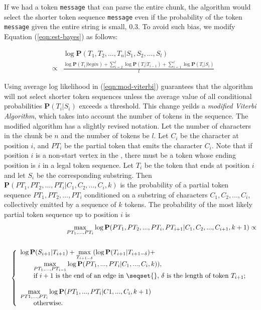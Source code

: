 If we had a token {\tt message} that can parse the entire chunk,
the algorithm would select the shorter token sequence {\tt message}
even if the probability of the token {\tt message} given the entire
string is small, \eg{} 0.3.  To avoid such bias, we modify
Equation (\ref{eqn:est-bayes}) as follows:

\begin{eqnarray}
&& \log \mathbf{P}(T_1, T_2, ..., T_n|S_1, S_2, ..., S_l) \nonumber \\ 
& \propto & \frac{\log \mathbf{P}(T_1|begin) +
\sum_{i=2}^{l}\log \mathbf{P}(T_i|T_{i-1}) + 
\sum_{i=1}^{l}\log \mathbf{P}(T_i|S_i)}{l}\label{eqn:mod-viterbi}
\end{eqnarray}

Using average log likelihood in (\ref{eqn:mod-viterbi}) 
guarantees that the algorithm will not select shorter token sequences
unless the average value of all conditional
probabilities $\mathbf{P}(T_i|S_i)$ exceeds a threshold.
This change yeilds a {\em modified Viterbi Algorithm},
which takes into account the number of tokens in the sequence.
The modified algorithm has a slightly revised notation.
Let the number of characters in the chunk be $n$ and the number of tokens be $l$. 
Let $C_i$ be the character at position $i$, and 
$PT_i$ be the partial token that emits the character $C_i$. 
Note that if position $i$ is a non-start vertex in the \seqset{}, 
there must be a token whose ending position is
$i$ in a legal token sequence. Let $T_i$ be the token
that ends at position $i$ and let $S_i$ be the corresponding substring. 
Then
$\mathbf{P}(PT_1, PT_2, ..., PT_i|C_1, C_2, ..., C_i, k)$ is the
probability of a partial token sequence $PT_1, PT_2, ..., PT_i$
conditioned on a substring of characters $C_1, C_2, ..., C_i$,
collectively emitted by a sequence of $k$ tokens.
The probability of the most likely partial token sequence up to position 
$i$ is
\begin{eqnarray} 
&&\displaystyle{\max_{PT_1, ..., PT_i}}\log\mathbf{P}(PT_1, PT_2, ..., PT_i,
PT_{i+1}|C_1, C_2, ..., C_{i+1}, k+1) \propto \nonumber \\
&& \nonumber \\
&&\left\{
  \begin{array}{ll}
    \log \mathbf{P}(S_{i+1}|T_{i+1}) + 
    \displaystyle{\max_{T_{i+1-\delta}}}(\log\mathbf{P}(T_{i+1}|T_{i+1-\delta}) + \\
    \qquad \displaystyle{\max_{PT_1, ..., PT_{i-1}}}\log\mathbf{P}(PT_1, ..., PT_i|C_1, ..., C_i, k)), 
& \\ 
  \qquad \hbox{if $i+1$ is the end of an edge in \seqset{},
  $\delta$ is the length of token $T_{i+1}$;} \\\\
    \displaystyle{\max_{PT1, ..., PT_i}}\log\mathbf{P}(PT_1, ..., PT_i|C1, ...,
  C_i, k+1) \\
\qquad \hbox{otherwise.}
  \end{array}
\right. \label{eqn-forward}
\end{eqnarray}

